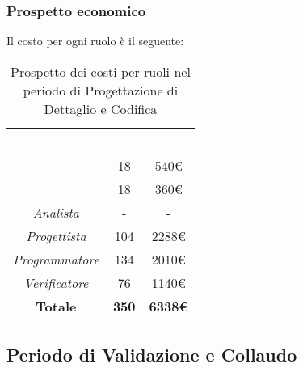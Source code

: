\subsubsection{Prospetto economico}
Il costo per ogni ruolo è il seguente:
\begin{table}[H]
	\begin{center}
		\begin{tabular}{ |c c c| }
		\rowcolor{darkblue} 
		\textcolor{white}{\textbf{Ruolo}} & \textcolor{white}{\textbf{Ore}} & \textcolor{white}{\textbf{Costo}} \\ \hline
		\textit{\Responsabile} 	& 18 	& 540€ \\ \hline
		\textit{\Amministratore} 	& 18 	& 360€ \\ \hline
		\textit{Analista} 		& - 	& - \\ \hline
		\textit{Progettista} 	& 104 	& 2288€ \\ \hline
		\textit{Programmatore}  	& 134 	& 2010€ \\ \hline
		\textit{Verificatore} 	& 76 	& 1140€ \\ \hline
		\textbf{Totale} & \textbf{350} & \textbf{6338€} \\ \hline
		\end{tabular}
	\caption{ Prospetto dei costi per ruoli nel periodo di Progettazione di Dettaglio e Codifica}
	\end{center}
\end{table}

\subsection{Periodo di Validazione e Collaudo}
